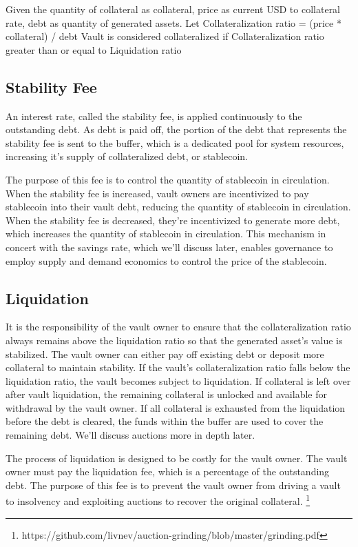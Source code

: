 \documentclass[12pt]{article}
\begin{document}
Given the quantity of collateral as collateral, price as current USD to collateral rate, debt as quantity of generated assets.
Let Collateralization ratio = (price * collateral) / debt
Vault is considered collateralized if Collateralization ratio greater than or equal to Liquidation ratio


\subsection{Stability Fee}


An interest rate, called the stability fee, is applied continuously to the outstanding debt. As debt is paid off, the portion of the debt that represents the stability fee is sent to the buffer, which is a dedicated pool for system resources, increasing it's supply of collateralized debt, or stablecoin.

The purpose of this fee is to control the quantity of stablecoin in circulation. When the stability fee is increased, vault owners are incentivized to pay stablecoin into their vault debt, reducing the quantity of stablecoin in circulation. When the stability fee is decreased, they're incentivized to generate more debt, which increases the quantity of stablecoin in circulation. This mechanism in concert with the savings rate, which we'll discuss later, enables governance to employ supply and demand economics to control the price of the stablecoin.

\subsection{Liquidation}

It is the responsibility of the vault owner to ensure that the collateralization ratio always remains above the liquidation ratio so that the generated asset's value is stabilized. The vault owner can either pay off existing debt or deposit more collateral to maintain stability. If the vault's collateralization ratio falls below the liquidation ratio, the vault becomes subject to liquidation. If collateral is left over after vault liquidation, the remaining collateral is unlocked and available for withdrawal by the vault owner. If all collateral is exhausted from the liquidation before the debt is cleared, the funds within the buffer are used to cover the remaining debt. We'll discuss auctions more in depth later.

The process of liquidation is designed to be costly for the vault owner. The vault owner must pay the liquidation fee, which is a percentage of the outstanding debt. The purpose of this fee is to prevent the vault owner from driving a vault to insolvency and exploiting auctions to recover the original collateral. \footnote{https://github.com/livnev/auction-grinding/blob/master/grinding.pdf}
	
\end{document}
